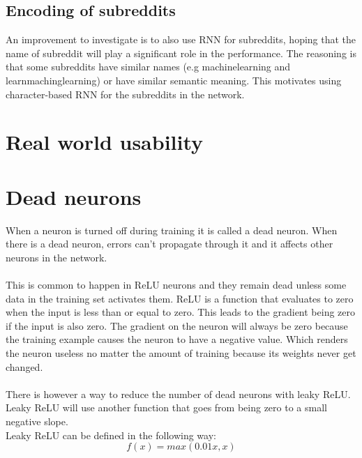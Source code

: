 \subsection{Encoding of subreddits}
An improvement to investigate is to also use RNN for subreddits, hoping that the name of subreddit will play a significant role in the performance. The reasoning is that some subreddits have similar names (e.g machinelearning and learnmachinglearning) or have similar semantic meaning. This motivates using character-based RNN for the subreddits in the network.

\section{Real world usability}

\section{Dead neurons}
When a neuron is turned off during training it is called a dead neuron. When there is a dead neuron, errors can't propagate through it and it affects other neurons in the network.\\\\
This is common to happen in ReLU neurons and they remain dead unless some data in the training set activates them. ReLU is a function that evaluates to zero when the input is less than or equal to zero. This leads to the gradient being zero if the input is also zero. The gradient on the neuron will always be zero because the training example causes the neuron to have a negative value. Which renders the neuron useless no matter the amount of training because its weights never get changed.\\\\
There is however a way to reduce the number of dead neurons with leaky ReLU. Leaky ReLU will use another function that goes from being zero to a small negative slope.\parencite{maas2013rectifier} \\
Leaky ReLU can be defined in the following way:\\
\begin{equation}
    f(x)=max(0.01x,x)
\end{equation}